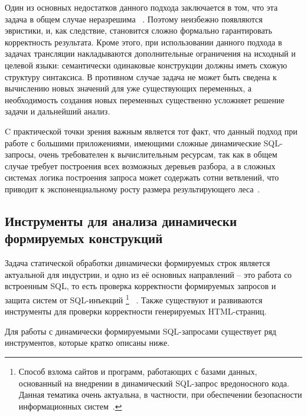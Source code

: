 \documentclass[a5paper]{article}
\begin{document}
Один из основных недостатков данного подхода заключается в том, что эта задача в общем случае неразрешима ~\cite{ALVOR2}. Поэтому неизбежно появляются эвристики, и, как следствие, становится сложно формально гарантировать корректность результата. Кроме этого, при использовании данного подхода в задачах  трансляции накладываются дополнительные ограничения на исходный и целевой языки: семантически одинаковые конструкции должны иметь схожую структуру синтаксиса. В противном случае задача не может быть сведена к вычислению новых значений для уже существующих переменных, а необходимость создания новых переменных существенно усложняет решение задачи и дальнейший анализ.

C практической точки зрения важным является тот факт, что данный подход при работе с  большими приложениями, имеющими  сложные динамические SQL-запросы, очень требователен к вычислительным ресурсам, так как в общем случае требует построения всех возможных деревьев разбора, а в сложных системах логика построения запроса может содержать сотни ветвлений, что приводит к экспоненциальному росту размера результирующего леса~\cite{TiunovaUIInt}. 

\subsection{ Инструменты для анализа динамически формируемых конструкций}

Задача статической обработки динамически формируемых строк является актуальной для индустрии, и одно из её основных направлений  -- это работа со встроенным SQL, то есть проверка корректности формируемых запросов и защита систем от SQL-инъекций \footnote{Способ взлома сайтов и программ, работающих с базами данных, основанный на  внедрении в динамический SQL-запрос вредоносного кода. Данная тематика очень актуальна, в частности, при обеспечении безопасности информационных систем~\cite{SAForInject}.} ~\cite{SAForInject}. Также существуют и развиваются инструменты для проверки корректности генерируемых HTML-страниц.

Для работы с динамически формируемыми SQL-запросами существует ряд инструментов, которые кратко описаны ниже.
\end{document}
